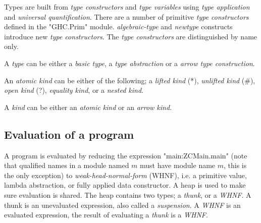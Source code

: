 Types are built from \emph{type constructors} and \emph{type variables} using
\emph{type application} and \emph{universal quantification}. There are a number
of primitive \emph{type constructors} defined in the "GHC.Prim" module. 
\emph{algebraic-type} and \emph{newtype} constructs introduce new 
\emph{type constructors}. The \emph{type constructors} are distinguished by name
only.

A \emph{type} can be either a \emph{basic type}, a \emph{type abstraction} or a
\emph{arrow type construction}.


An \emph{atomic kind} can be either of the following; a \emph{lifted kind} (*), 
\emph{unlifted kind} (\#{}), \emph{open kind} (?), \emph{equality kind}, or a
\emph{nested kind}.


A \emph{kind} can be either an \emph{atomic kind} or an \emph{arrow kind}.


\subsection{Evaluation of a program}

A program is evaluated by reducing the expression "main:ZCMain.main" (note that
qualified names in a module named $m$ must have module name $m$, this is the only exception) 
to \emph{weak-head-normal-form} (WHNF), i.e. a primitive value, lambda abstraction, or 
fully applied data constructor. A heap is used to make
sure evaluation is shared. The heap contains two types; a \emph{thunk}, 
or a \emph{WHNF}. A thunk is an unevaluated
expression, also called a \emph{suspension}. A \emph{WHNF} is an evaluated expression, 
the result of evaluating a \emph{thunk} is a \emph{WHNF}. \cite{tolmach2010ghc}

